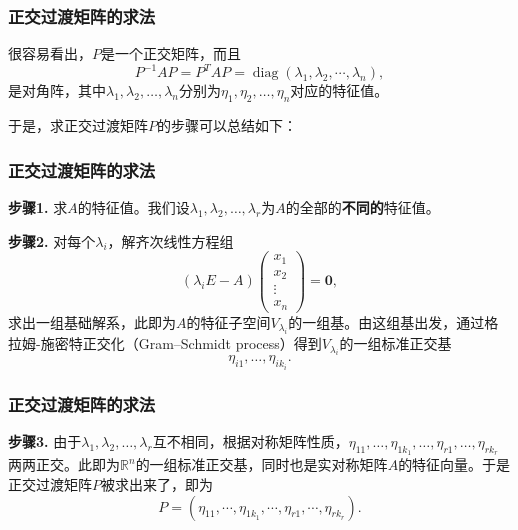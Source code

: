 
\begin{frame}
\frametitle{正交过渡矩阵的求法}

很容易看出，$P$是一个正交矩阵，而且
\[P^{-1}AP = P^TAP = \operatorname{diag}(\lambda_1, \lambda_2, \cdots, \lambda_n),\]
是对角阵，其中$\lambda_1, \lambda_2, \ldots, \lambda_n$分别为$\eta_1, \eta_2, \ldots, \eta_n$对应的特征值。

\pause
\vspace{1em}

于是，求正交过渡矩阵$P$的步骤可以总结如下：

\end{frame}


\begin{frame}
\frametitle{正交过渡矩阵的求法}

{\bfseries 步骤1.} 求$A$的特征值。我们设$\lambda_1, \lambda_2, \ldots, \lambda_r$为$A$的全部的{\bfseries 不同的}特征值。

\pause
\vspace{1em}

{\bfseries 步骤2.} 对每个$\lambda_i$，解齐次线性方程组
\[\left( \lambda_i E - A \right) \begin{pmatrix} x_1 \\ x_2 \\ \vdots \\ x_n \end{pmatrix} = \mathbf{0},\]
求出一组基础解系，此即为$A$的特征子空间$V_{\lambda_i}$的一组基。由这组基出发，通过格拉姆-施密特正交化（Gram–Schmidt process）得到$V_{\lambda_i}$的一组标准正交基
\[\eta_{i1}, \ldots, \eta_{ik_i}.\]

\end{frame}


\begin{frame}
\frametitle{正交过渡矩阵的求法}

{\bfseries 步骤3.} 由于$\lambda_1, \lambda_2, \ldots, \lambda_r$互不相同，根据对称矩阵性质，$\eta_{11}, \ldots, \eta_{1k_1}, \ldots, \eta_{r1}, \ldots, \eta_{rk_r}$两两正交。此即为$\mathbb{R}^n$的一组标准正交基，同时也是实对称矩阵$A$的特征向量。于是正交过渡矩阵$P$被求出来了，即为
\[P = (\eta_{11}, \cdots, \eta_{1k_1}, \cdots, \eta_{r1}, \cdots, \eta_{rk_r}).\]

\end{frame}

